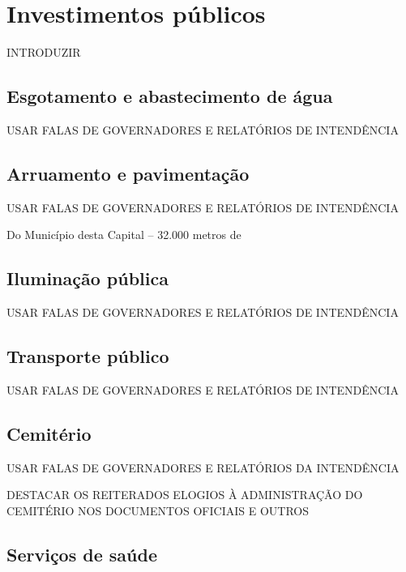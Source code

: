 \section{Investimentos públicos}\label{sec:3.1}

INTRODUZIR

\subsection{Esgotamento e abastecimento de água}\label{subsec:3.1.1}

USAR FALAS DE GOVERNADORES E RELATÓRIOS DE INTENDÊNCIA

\subsection{Arruamento e pavimentação}\label{subsec:3.1.2}

USAR FALAS DE GOVERNADORES E RELATÓRIOS DE INTENDÊNCIA

\begin{citacao}
Do Município desta Capital -- 32.000 metros de 
\end{citacao}

\subsection{Iluminação pública}\label{subsec:3.1.3}

USAR FALAS DE GOVERNADORES E RELATÓRIOS DE INTENDÊNCIA

\subsection{Transporte público}\label{subsec:3.1.4}

USAR FALAS DE GOVERNADORES E RELATÓRIOS DE INTENDÊNCIA

\subsection{Cemitério}\label{subsec:3.1.5}

USAR FALAS DE GOVERNADORES E RELATÓRIOS DA INTENDÊNCIA

DESTACAR OS REITERADOS ELOGIOS À ADMINISTRAÇÃO DO CEMITÉRIO NOS DOCUMENTOS OFICIAIS E OUTROS

\subsection{Serviços de saúde}\label{subsec:3.1.6}

